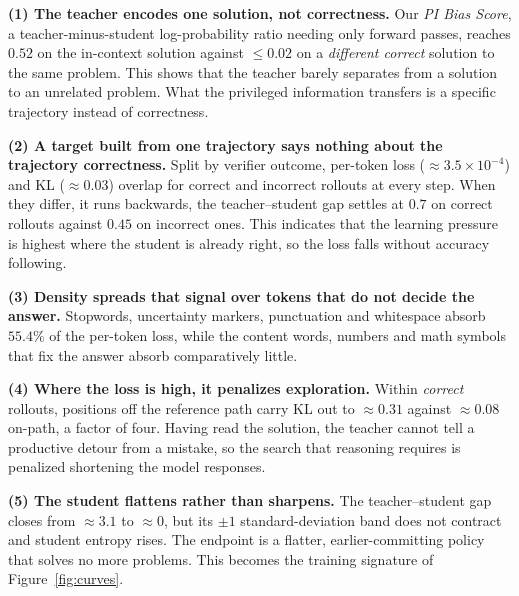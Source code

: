 \documentclass{article}
\begin{document}
\textbf{(1) The teacher encodes one solution, not correctness.} Our \textit{PI Bias Score}, a teacher-minus-student log-probability ratio needing only forward passes, reaches $0.52$ on the in-context solution against ${\le}0.02$ on a \emph{different correct} solution to the same problem. This shows that the teacher barely separates from a solution to an unrelated problem. What the privileged information transfers is a specific trajectory instead of correctness.

\textbf{(2) A target built from one trajectory says nothing about the trajectory correctness.} Split by verifier outcome, per-token loss (${\approx}3.5\times10^{-4}$) and KL (${\approx}0.03$) overlap for correct and incorrect rollouts at every step. When they differ, it runs backwards, the teacher--student gap settles at $0.7$ on correct rollouts against $0.45$ on incorrect ones. This indicates that the learning pressure is highest where the student is already right, so the loss falls without accuracy following.

\textbf{(3) Density spreads that signal over tokens that do not decide the answer.} Stopwords, uncertainty markers, punctuation and whitespace absorb $55.4\%$ of the per-token loss, while the content words, numbers and math symbols that fix the answer absorb comparatively little.

\textbf{(4) Where the loss is high, it penalizes exploration.} Within \emph{correct} rollouts, positions off the reference path carry KL out to ${\approx}0.31$ against ${\approx}0.08$ on-path, a factor of four. Having read the solution, the teacher cannot tell a productive detour from a mistake, so the search that reasoning requires is penalized shortening the model responses.

\textbf{(5) The student flattens rather than sharpens.} The teacher--student gap closes from ${\approx}3.1$ to ${\approx}0$, but its $\pm1$ standard-deviation band does not contract and student entropy rises. The endpoint is a flatter, earlier-committing policy that solves no more problems. This becomes the training signature of Figure~\ref{fig:curves}.

\end{document}
